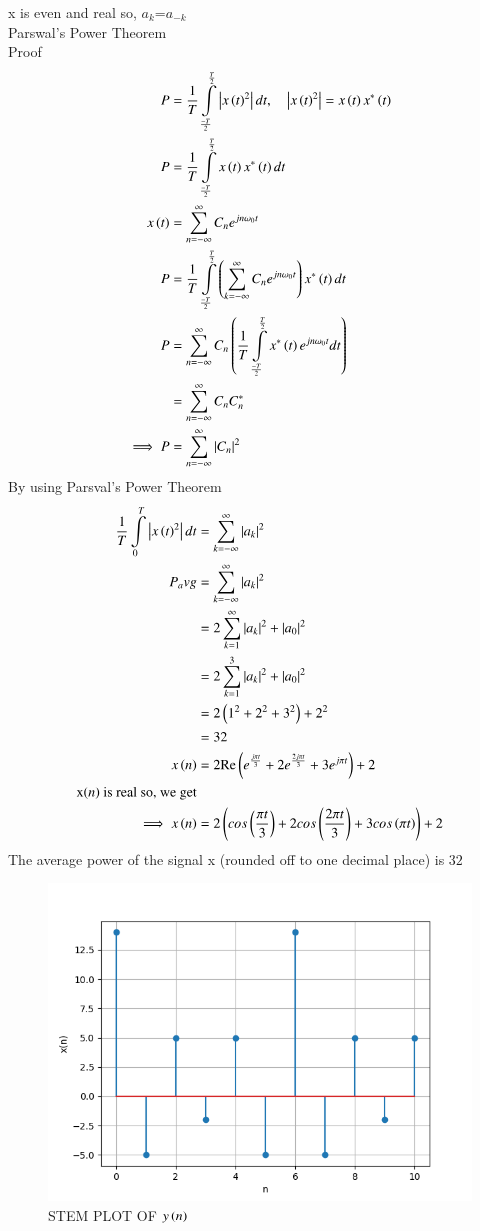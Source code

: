 \documentclass[a4,12pt,onecolumn]{IEEEtran}
\begin{document}
x is even and real so, $a_k$=$a_{-k}$\\
Parswal's Power Theorem\\
Proof
\begin{align}
P&=\frac{1}{T}\int\limits_{\frac{-T}{2}}^{\frac{T}{2}}\left| x\left(t\right)^2 \right|dt ,\quad{\left| x\ensuremath{\left(t\right)}^2 \right|=x\ensuremath{\left(t\right)}x^*\ensuremath{\left(t\right)}}\\
P&=\frac{1}{T}\int\limits_{\frac{-T}{2}}^{\frac{T}{2}}x\left(t\right)x^*\left(t\right)dt \\
x\left(t\right)&=\sum\limits_{n=-\infty}^{\infty}C_ne^{jn\omega_0t}\\
P&=\frac{1}{T}\int\limits_{\frac{-T}{2}}^{\frac{T}{2}}\left(\sum\limits_{k=-\infty}^{\infty}C_ne^{jn\omega_0t}\right)x^*\left(t\right)dt\\
P&=\sum\limits_{n=-\infty}^{\infty}C_n\left(\frac{1}{T}\int\limits_{\frac{-T}{2}}^{\frac{T}{2}}x^*\left(t\right)e^{jn\omega_0t}dt\right)\\
&=\sum\limits_{n=-\infty}^{\infty}C_nC^*_n\\
\implies P&=\sum\limits_{n=-\infty}^{\infty}\left| C_n \right|^2
\end{align}
By using Parsval's Power Theorem
\begin{align}
\frac{1}{T}\int\limits_{0}^{T}\left| x\left(t\right)^2 \right|dt&=\sum\limits_{k=-\infty}^{\infty}\left| a_k \right|^2\\
P_avg&=\sum\limits_{k=-\infty}^{\infty}\left| a_k \right|^2\\
&=2\sum\limits_{k=1}^{\infty}\left| a_k \right|^2 +|a_0|^2\\
&=2\sum\limits_{k=1}^{3}\left| a_k \right|^2  +|a_0|^2 \\
&=2\left(1^2+2^2+3^2\right)+2^2\\
&=32\\
x\left(n\right)&=2\text{Re}\left(e^{\frac{j\pi t}{3}}+2e^{\frac{2j\pi t}{3}}+3e^{j\pi t}\right) + 2\\
\text{x\ensuremath{\left(n\right)} is real so, we get}\\
\implies x\left(n\right)&=2\left(cos\left(\frac{\pi t}{3}\right)+2cos\left(\frac{2\pi t}{3}\right)+3cos\left(\pi t\right)\right) + 2
\end{align}
The average power of the signal x (rounded off to one decimal place) is $32$
\begin{figure}[ht!]
\includegraphics[width=\columnwidth]{figs/fig.png}
\caption{\large{STEM PLOT OF $y\left(n\right)$}}
\end{figure}
\end{document}
